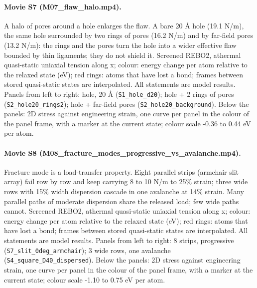 \paragraph{Movie S7 (M07\_flaw\_halo.mp4).} A halo of pores around a hole enlarges the flaw. A bare 20 \AA{} hole (19.1 N/m), the same hole surrounded by two rings of pores (16.2 N/m) and by far-field pores (13.2 N/m): the rings and the pores turn the hole into a wider effective flaw bounded by thin ligaments; they do not shield it. Screened REBO2, athermal quasi-static uniaxial tension along x; colour: energy change per atom relative to the relaxed state (eV); red rings: atoms that have lost a bond; frames between stored quasi-static states are interpolated. All statements are model results. Panels from left to right: hole, 20 \AA{} (\texttt{S1\_hole\_d20}); hole + 2 rings of pores (\texttt{S2\_hole20\_rings2}); hole + far-field pores (\texttt{S2\_hole20\_background}). Below the panels: 2D stress against engineering strain, one curve per panel in the colour of the panel frame, with a marker at the current state; colour scale -0.36 to 0.44 eV per atom.

\paragraph{Movie S8 (M08\_fracture\_modes\_progressive\_vs\_avalanche.mp4).} Fracture mode is a load-transfer property. Eight parallel strips (armchair slit array) fail row by row and keep carrying 8 to 10 N/m to 25\% strain; three wide rows with 15\% width dispersion cascade in one avalanche at 14\% strain. Many parallel paths of moderate dispersion share the released load; few wide paths cannot. Screened REBO2, athermal quasi-static uniaxial tension along x; colour: energy change per atom relative to the relaxed state (eV); red rings: atoms that have lost a bond; frames between stored quasi-static states are interpolated. All statements are model results. Panels from left to right: 8 strips, progressive (\texttt{S7\_slit\_0deg\_armchair}); 3 wide rows, one avalanche (\texttt{S4\_square\_D40\_dispersed}). Below the panels: 2D stress against engineering strain, one curve per panel in the colour of the panel frame, with a marker at the current state; colour scale -1.10 to 0.75 eV per atom.

